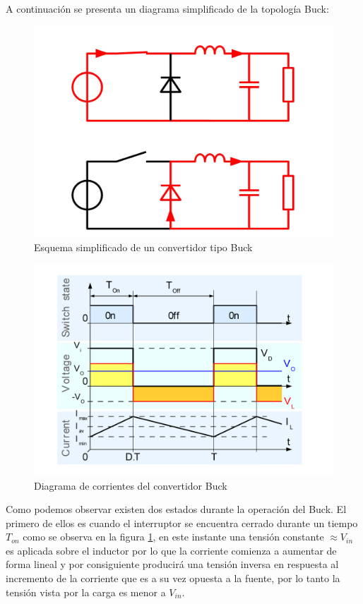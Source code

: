 \documentclass[12pt]{report}
\begin{document}
	A continuación se presenta un diagrama simplificado de la topología Buck:
	
	\begin{figure}[H]
		\centering
		\includegraphics[width=\textwidth,height=\textheight,keepaspectratio]{buck_topology}
		\caption{Esquema simplificado de un convertidor tipo Buck}
	\end{figure}

	\begin{figure}[H]
		\centering
		\includegraphics[width=\textwidth,height=\textheight,keepaspectratio]{buck_currents}
		\caption{Diagrama de corrientes del convertidor Buck}
		\label{buck:currents}
	\end{figure}

	Como podemos observar existen dos estados durante la operación del Buck. El primero de ellos es cuando el interruptor se encuentra cerrado durante un tiempo $T_{on}$ como se observa en la figura \ref{buck:currents}, en este instante una tensión constante $\approx V_{in}$ es aplicada sobre el inductor por lo que la corriente comienza a aumentar de forma lineal y por consiguiente producirá una tensión inversa en respuesta al incremento de la corriente que es a su vez opuesta a la fuente, por lo tanto la tensión vista por la carga es menor a $V_{in}$.
	
\end{document}
